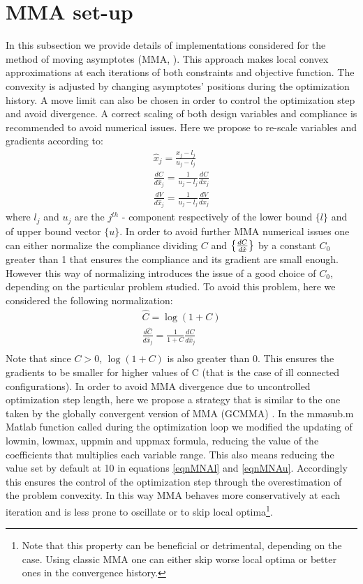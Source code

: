 \section{MMA set-up}
\label{A1}
In this subsection we provide details of implementations considered for the method of moving asymptotes (MMA, \cite{svanberg1987method}). This approach makes local convex approximations at each iterations of both constraints and objective function. The convexity is adjusted by changing asymptotes' positions during the optimization history. A move limit can also be chosen in order to control the optimization step and avoid divergence. A correct scaling of both design variables and compliance is recommended to avoid numerical issues. Here we propose to re-scale variables and gradients according to:
\begin{eqnarray}
\hat{x}_j= \frac{x_j-l_{j}}{u_j-l_j}\\
\frac{dC}{d\hat{x}_j}=\frac{1}{u_j-l_j}\frac{dC}{dx_j}\\
\frac{dV}{d\hat{x}_j}=\frac{1}{u_j-l_j}\frac{dV}{dx_j}
\end{eqnarray}
where $l_j$ and $u_j$ are the $j^{th}$ - component respectively of the lower bound $\{l\}$ and of upper bound vector $\{u\}$. 
In order to avoid further MMA numerical issues one can either normalize the compliance dividing $C$ and $\left\{{\frac{dC}{d\hat{x}}}\right\}$ by a constant $C_0$ greater than 1 that ensures the compliance and its gradient are small enough. However this way of normalizing introduces the issue of a good choice of $C_0$, depending on the particular problem studied. To avoid this problem, here we considered the following normalization:
\begin{eqnarray}
\hat{C}=\log{\left(1+C\right)}\\
\frac{d\hat{C}}{d\hat{x}_j}=\frac{1}{1+C}\frac{dC}{d\hat{x}_j}\\
\end{eqnarray}
Note that since $C>0$, $\log{\left(1+C\right)}$ is also greater than $0$. This ensures the gradients to be smaller for higher values of C (that is the case of ill connected configurations). In order to avoid MMA divergence due to uncontrolled optimization step length, here we propose a strategy that is similar to the one taken by the globally convergent version of MMA (GCMMA) \cite{svanberg2002class}. In the mmasub.m Matlab function called during the optimization loop we modified the updating of lowmin, lowmax, uppmin and uppmax formula, reducing the value of the coefficients that multiplies each variable range. This also means reducing the value set by default at 10 in equations \ref{eqnMNAl} and \ref{eqnMNAu}.
Accordingly this ensures the control of the optimization step through the overestimation of the problem convexity. In this way MMA behaves more conservatively at each iteration and is less prone to oscillate or to skip local optima\footnote{Note that this property can be beneficial or detrimental, depending on the case. Using classic MMA one can either skip worse local optima or better ones in the convergence history.}.